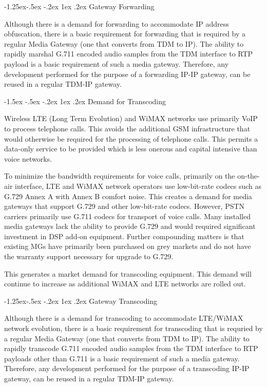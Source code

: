 \documentclass[letterpaper,final,notitlepage,twocolumn,10pt,twoside]{article}
\makeatletter
\let\normalsize = \small
\let\small = \footnotesize
\let\footnotesize = \scriptsize
\let\scriptsize = \tiny
\renewcommand\subsection{\@startsection{subsection}{2}{\z@}%
                                     {-1.5ex \@plus -.5ex \@minus -.2ex}%
                                     {1ex \@plus .2ex}%
                                     {\normalfont\normalsize\bfseries}}
\renewcommand\subsubsection{\@startsection{subsubsection}{3}{\z@}%
                                     {-1.25ex\@plus -.5ex \@minus -.2ex}%
                                     {1ex \@plus .2ex}%
                                     {\normalfont\normalsize\bfseries}}
\makeatother
\begin{document}
\subsubsection{Gateway Forwarding}

Although there is a demand for forwarding to accommodate IP address
obfuscation, there is a basic requirement for forwarding that is required by
a regular Media Gateway (one that converts from TDM to IP).  The ability to
rapidly marshal G.711 encoded audio samples from the TDM interface to RTP
payload is a basic requirement of such a media gateway.  Therefore, any
development performed for the purpose of a forwarding IP-IP gateway, can be
reused in a regular TDM-IP gateway.

\subsection{Demand for Transcoding}

Wireless LTE (Long Term Evolution) and WiMAX networks use primarily VoIP to
process telephone calls.  This avoids the additional GSM infrastructure that
would otherwise be required for the processing of telephone calls.  This permits
a data-only service to be provided which is less onerous and capital intensive
than voice networks.

To minimize the bandwidth requirements for voice calls, primarily on the
on-the-air interface, LTE and WiMAX network operators use low-bit-rate codecs
such as G.729 Annex A with Annex B comfort noise.  This creates a demand for
media gateways that support G.729 and other low-bit-rate codecs.  However, PSTN
carriers primarily use G.711 codecs for transport of voice calls.  Many
installed media gateways lack the ability to provide G.729 and would required
significant investment in DSP add-on equipment.  Further compounding matters is
that existing MGs have primarily been purchased on grey markets and do not have
the warranty support necessary for upgrade to G.729.

This generates a market demand for transcoding equipment.  This demand will
continue to increase as additional WiMAX and LTE networks are rolled out.

\subsubsection{Gateway Transcoding}

Although there is a demand for transcoding to accommodate LTE/WiMAX network
evolution, there is a basic requirement for transcoding that is requried by a
regular Media Gateway (one that converts from TDM to IP).  The ability to
rapidly transcode G.711 encoded audio samples from the TDM interface to RTP
payloads other than G.711 is a basic requirement of such a media gateway.
Therefore, any development performed for the purpose of a transcoding IP-IP
gateway, can be reused in a regular TDM-IP gateway.
\end{document}
